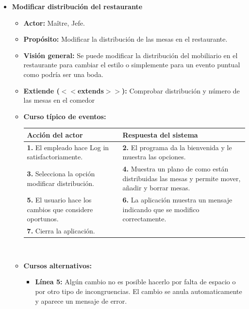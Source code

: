 \documentclass[spanish,a4paper,12pt]{report}		%
\begin{document}
\begin{itemize}
		\item \textbf{Modificar distribución del restaurante}
			\begin{itemize}
			\item \textbf{Actor:} Maître, Jefe.
			\item \textbf{Propósito: } Modificar la distribución de las mesas en el restaurante.
			\item \textbf{Visión general:} Se puede modificar la distribución del mobiliario en el restaurante para cambiar el estilo o simplemente para un evento puntual como podría ser una boda.
			\item \textbf{Extiende ($<<$extends$>>$):} Comprobar distribución y número de las mesas en el comedor
			\item \textbf{Curso típico de eventos:} 	\\
				\begin{tabular}{|p{6cm}||p{6cm}|}
				\hline
				\textbf{Acción del actor} & \textbf{Respuesta del sistema} \\ \hline \hline
				\textbf{1.} El empleado hace Log in satisfactoriamente. & \textbf{2.} El programa da la bienvenida y le muestra las opciones. \\ \hline
				\textbf{3.} Selecciona la opción modificar distribución. & \textbf{4.} Muestra un plano de como están distribuidas las mesas y permite mover, añadir y borrar mesas. \\ \hline
				\textbf{5.} El usuario hace los cambios que considere oportunos.	& \textbf{6.} La aplicación muestra un mensaje indicando que se modifico correctamente. \\ \hline
				\textbf{7.} Cierra la aplicación. & \textbf{} \\ \hline
			\end{tabular}
			\\
			\item \textbf{Cursos alternativos:} 
			\begin{itemize}
			\item  \textbf{Línea 5:} Algún cambio no es posible hacerlo por falta de espacio o por otro tipo de incongruencias. El cambio se anula automaticamente y aparece un mensaje de error.
			\end {itemize}
		\end {itemize}



\end{itemize}
\end{document}
